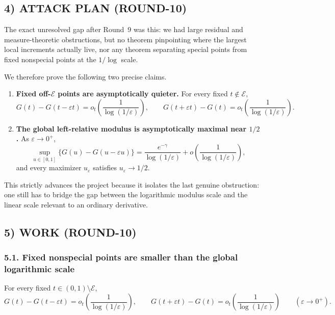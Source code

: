 \subsection{4) ATTACK PLAN (ROUND-10)}

The exact unresolved gap after Round~9 was this: we had large residual and measure-theoretic obstructions, but no theorem pinpointing where the largest local increments actually live, nor any theorem separating special points from fixed nonspecial points at the $1/\log$ scale.

We therefore prove the following two precise claims.

\begin{enumerate}
\item \textbf{Fixed off-$\mathcal E$ points are asymptotically quieter.}
For every fixed $t\notin\mathcal E$,
\[
G(t)-G(t-\varepsilon t)=o_t\!\left(\frac1{\log(1/\varepsilon)}\right),
\qquad
G(t+\varepsilon t)-G(t)=o_t\!\left(\frac1{\log(1/\varepsilon)}\right).
\]

\item \textbf{The global left-relative modulus is asymptotically maximal near $1/2$.}
As $\varepsilon\to0^+$,
\[
\sup_{u\in[0,1]}\{G(u)-G(u-\varepsilon u)\}
=\frac{e^{-\gamma}}{\log(1/\varepsilon)}+o\!\left(\frac1{\log(1/\varepsilon)}\right),
\]
and every maximizer $u_\varepsilon$ satisfies $u_\varepsilon\to 1/2$.
\end{enumerate}

This strictly advances the project because it isolates the last genuine obstruction: one still has to bridge the gap between the logarithmic modulus scale and the linear scale relevant to an ordinary derivative.

\subsection{5) WORK (ROUND-10)}

\subsubsection*{5.1. Fixed nonspecial points are smaller than the global logarithmic scale}

\begin{proposition}\label{prop:offE-small}
For every fixed $t\in(0,1)\setminus\mathcal E$,
\[
G(t)-G(t-\varepsilon t)=o_t\!\left(\frac1{\log(1/\varepsilon)}\right),
\qquad
G(t+\varepsilon t)-G(t)=o_t\!\left(\frac1{\log(1/\varepsilon)}\right)
\qquad(\varepsilon\to0^+).
\]
\end{proposition}

